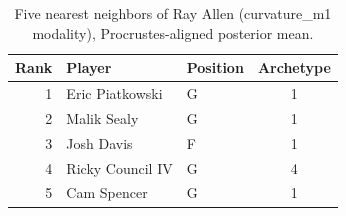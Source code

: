 \begin{table}[htbp]
  \centering\small
  \begin{tabular}{rllc}
    \toprule
    Rank & Player & Position & Archetype \\
    \midrule
    1 & Eric Piatkowski & G & 1 \\
    2 & Malik Sealy & G & 1 \\
    3 & Josh Davis & F & 1 \\
    4 & Ricky Council IV & G & 4 \\
    5 & Cam Spencer & G & 1 \\
    \bottomrule
  \end{tabular}
  \caption{Five nearest neighbors of Ray Allen (curvature_m1 modality), Procrustes-aligned posterior mean.}
  \label{tab:Ray_Allen_neighbors_curvature_m1}
\end{table}

